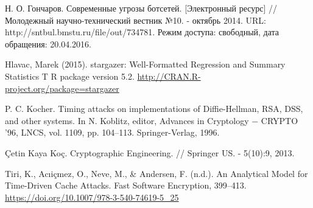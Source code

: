 \begingroup
\renewcommand{\section}[2]{\anonsection{Библиографический список}}
\begin{thebibliography}{00}

    Н. О. Гончаров.
    Современные угрозы ботсетей. [Электронный ресурс] // Молодежный научно-технический вестник №10. - октябрь 2014.
    URL: http://sntbul.bmstu.ru/file/out/734781.
    Режим доступа: свободный, дата обращения: 20.04.2016.

  Hlavac, Marek (2015). stargazer: Well-Formatted Regression and Summary Statistics T
  R package version 5.2. \url{http://CRAN.R-project.org/package=stargazer}

  P. C. Kocher. Timing attacks on implementations of Diffie-Hellman, RSA,
  DSS, and other systems. In N. Koblitz, editor, Advances in Cryptology −
  CRYPTO ’96, LNCS, vol. 1109, pp. 104–113. Springer-Verlag, 1996.

  Çetin Kaya Koç.
  Cryptographic Engineering. //
  Springer US. - 5(10):9, 2013.

  Tiri, K., Acıiçmez, O., Neve, M., \& Andersen, F. (n.d.).
  An Analytical Model for Time-Driven Cache Attacks.
  Fast Software Encryption, 399–413. \url{https://doi.org/10.1007/978-3-540-74619-5_25}

\end{thebibliography}
\endgroup

\clearpage
